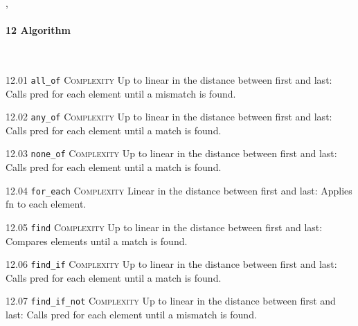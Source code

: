 \sep
{}
\paragraph{12 Algorithm}\mbox{}\\
\noindent\textcolor{corange}{12.01 \texttt{all\_of}} \textsc{Complexity} Up to linear in the distance between first and last: Calls pred for each element until a mismatch is found. \vspace{0.5em}

\noindent\textcolor{corange}{12.02 \texttt{any\_of}} \textsc{Complexity} Up to linear in the distance between first and last: Calls pred for each element until a match is found. \vspace{0.5em}

\noindent\textcolor{corange}{12.03 \texttt{none\_of}} \textsc{Complexity} Up to linear in the distance between first and last: Calls pred for each element until a match is found. \vspace{0.5em}

\noindent\textcolor{corange}{12.04 \texttt{for\_each}} \textsc{Complexity} Linear in the distance between first and last: Applies fn to each element. \vspace{0.5em}

\noindent\textcolor{corange}{12.05 \texttt{find}} \textsc{Complexity} Up to linear in the distance between first and last: Compares elements until a match is found. \vspace{0.5em}

\noindent\textcolor{corange}{12.06 \texttt{find\_if}} \textsc{Complexity} Up to linear in the distance between first and last: Calls pred for each element until a match is found. \vspace{0.5em}

\noindent\textcolor{corange}{12.07 \texttt{find\_if\_not}} \textsc{Complexity} Up to linear in the distance between first and last: Calls pred for each element until a mismatch is found. \vspace{0.5em}

